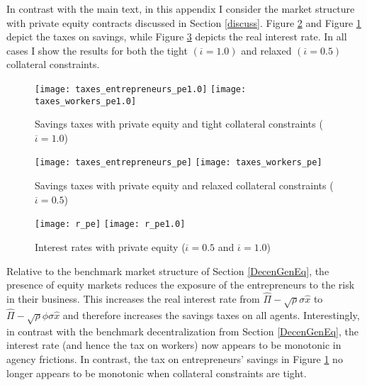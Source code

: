 \documentclass[11pt]{article}
\theoremstyle{plain}
\theoremstyle{definition} %
\begin{document}
In contrast with the main text, in this appendix I consider the market structure with private equity contracts discussed in Section \ref{discuss}. Figure \ref{tax_pe} and Figure \ref{tax_pe1.0} depict the taxes on savings, while Figure \ref{r_pe} depicts the real interest rate. In all cases I show the results for both the tight $(\overline{\iota} = 1.0)$ and relaxed $(\overline{\iota} = 0.5)$ collateral constraints. 

\begin{figure}[H]
\centering
\texttt{[image: taxes\_entrepreneurs\_pe1.0]}
\texttt{[image: taxes\_workers\_pe1.0]}
\caption{Savings taxes with private equity and tight collateral constraints ($\overline{\iota} = 1.0$)}
\label{tax_pe1.0} 
\end{figure} 

\begin{figure}[H]
\centering
\texttt{[image: taxes\_entrepreneurs\_pe]}
\texttt{[image: taxes\_workers\_pe]}
\caption{Savings taxes with private equity and relaxed collateral constraints ($\overline{\iota} = 0.5$)}
\label{tax_pe} 
\end{figure} 

\begin{figure}[H]
\centering
\texttt{[image: r\_pe]}
\texttt{[image: r\_pe1.0]}
\caption{Interest rates with private equity ($\overline{\iota} = 0.5$ and $\overline{\iota} = 1.0$)}
\label{r_pe} 
\end{figure}

Relative to the benchmark market structure of Section \ref{DecenGenEq}, the presence of equity markets reduces the exposure of the entrepreneurs to the risk in their business. This increases the real interest rate from $\hat{\Pi} - \sqrt{\rho}\sigma \hat{x}$ to $\hat{\Pi} - \sqrt{\rho}\phi\sigma \hat{x}$ and therefore increases the savings taxes on all agents. Interestingly, in contrast with the benchmark decentralization from Section \ref{DecenGenEq}, the interest rate (and hence the tax on workers) now appears to be monotonic in agency frictions. In contrast, the tax on entrepreneurs' savings in Figure \ref{tax_pe1.0} no longer appears to be monotonic when collateral constraints are tight. 
\end{document}
